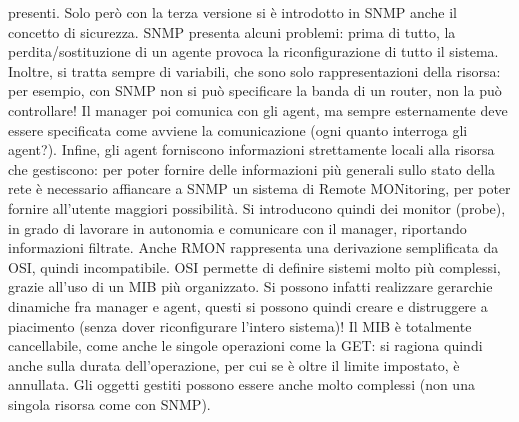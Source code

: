 presenti. Solo però con la terza versione si è introdotto in SNMP anche il concetto di sicurezza.
SNMP presenta alcuni problemi: prima di tutto, la perdita/sostituzione di un agente provoca la riconfigurazione di 
tutto il sistema. Inoltre, si tratta sempre di variabili, che sono solo rappresentazioni della risorsa: per esempio, 
con SNMP non si può specificare la banda di un router, non la può controllare! Il manager poi comunica con gli agent, 
ma sempre esternamente deve essere specificata come avviene la comunicazione (ogni quanto interroga gli agent?). 
Infine, gli agent forniscono informazioni strettamente locali alla risorsa che gestiscono:
per poter fornire delle informazioni più generali sullo stato della rete è necessario affiancare a SNMP un sistema di
Remote MONitoring, per poter fornire all'utente maggiori possibilità. Si introducono quindi dei monitor (probe), in
grado di lavorare in autonomia e comunicare con il manager, riportando informazioni filtrate. Anche RMON rappresenta 
una derivazione semplificata da OSI, quindi incompatibile.
OSI permette di definire sistemi molto più complessi, grazie all'uso di un MIB più organizzato. Si possono infatti
realizzare gerarchie dinamiche fra manager e agent, questi si possono quindi creare e distruggere a piacimento (senza
dover riconfigurare l'intero sistema)! Il MIB è totalmente cancellabile, come anche le singole operazioni come la GET:
si ragiona quindi anche sulla durata dell'operazione, per cui se è oltre il limite impostato, è annullata. Gli oggetti
gestiti possono essere anche molto complessi (non una singola risorsa come con SNMP).
